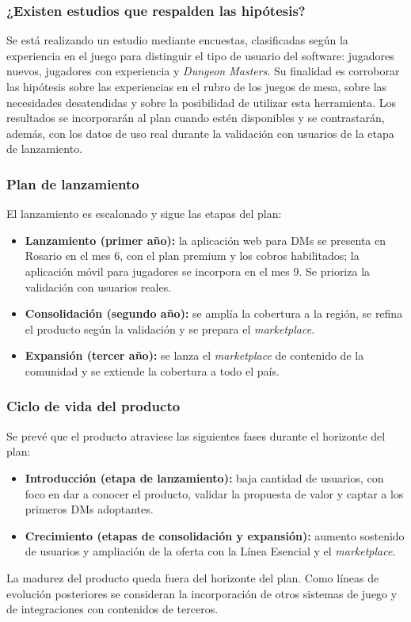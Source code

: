 \subsubsection{¿Existen estudios que respalden las hipótesis?}
Se está realizando un estudio mediante encuestas, clasificadas según la experiencia en el juego para distinguir el tipo de usuario del software: jugadores nuevos, jugadores con experiencia y \textit{Dungeon Masters}. Su finalidad es corroborar las hipótesis sobre las experiencias en el rubro de los juegos de mesa, sobre las necesidades desatendidas y sobre la posibilidad de utilizar esta herramienta. Los resultados se incorporarán al plan cuando estén disponibles y se contrastarán, además, con los datos de uso real durante la validación con usuarios de la etapa de lanzamiento.

\subsubsection{Plan de lanzamiento}
El lanzamiento es escalonado y sigue las etapas del plan:
\begin{itemize}
  \item \textbf{Lanzamiento (primer año):} la aplicación web para DMs se presenta en Rosario en el mes 6, con el plan premium y los cobros habilitados; la aplicación móvil para jugadores se incorpora en el mes 9. Se prioriza la validación con usuarios reales.
  \item \textbf{Consolidación (segundo año):} se amplía la cobertura a la región, se refina el producto según la validación y se prepara el \textit{marketplace}.
  \item \textbf{Expansión (tercer año):} se lanza el \textit{marketplace} de contenido de la comunidad y se extiende la cobertura a todo el país.
\end{itemize}

\subsubsection{Ciclo de vida del producto}
Se prevé que el producto atraviese las siguientes fases durante el horizonte del plan:
\begin{itemize}
  \item \textbf{Introducción (etapa de lanzamiento):} baja cantidad de usuarios, con foco en dar a conocer el producto, validar la propuesta de valor y captar a los primeros DMs adoptantes.
  \item \textbf{Crecimiento (etapas de consolidación y expansión):} aumento sostenido de usuarios y ampliación de la oferta con la Línea Esencial y el \textit{marketplace}.
\end{itemize}
La madurez del producto queda fuera del horizonte del plan. Como líneas de evolución posteriores se consideran la incorporación de otros sistemas de juego y de integraciones con contenidos de terceros.

